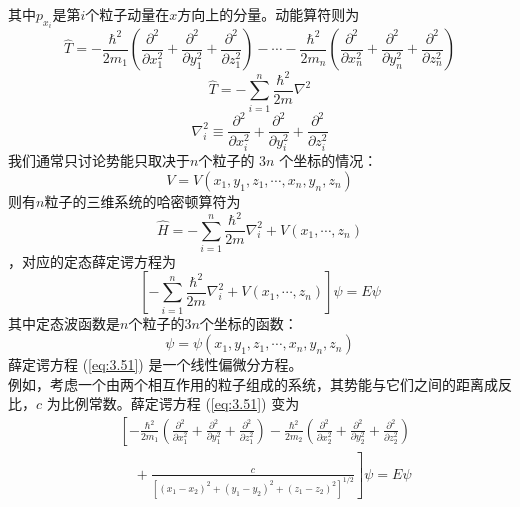 	其中$p_{x_i}$是第$i$个粒子动量在$x$方向上的分量。动能算符则为
	\begin{equation*}
		\hat{T} = -\frac{\hbar^2}{2m_1}\left(\frac{\partial^2}{\partial x_1^2}+\frac{\partial^2}{\partial y_1^2}+\frac{\partial^2}{\partial z_1^2}\right) - \cdots - \frac{\hbar^2}{2m_n}\left(\frac{\partial^2}{\partial x_n^2}+\frac{\partial^2}{\partial y_n^2}+\frac{\partial^2}{\partial z_n^2}\right)
	\end{equation*}
	\begin{equation}
		\boxed{
			\hat{T} = - \sum_{i=1}^{n}\frac{\hbar^2}{2m}\nabla^2
		}
		\label{eq:3.48}
	\end{equation}
	\begin{equation}
		\boxed{
			\nabla_i^2 \equiv \frac{\partial^2}{\partial x_i^2} + \frac{\partial^2}{\partial y_i^2} + \frac{\partial^2}{\partial z_i^2}
		}
		\label{eq:3.49}
	\end{equation}
	我们通常只讨论势能只取决于$n$个粒子的 $3n$ 个坐标的情况：
	\begin{equation*}
		V = V\left(x_1,y_1,z_1,\cdots, x_n,y_n,z_n\right)
	\end{equation*}
	则有$n$粒子的三维系统的哈密顿算符为
	\begin{equation}
		\boxed{
			\hat{H} = -\sum_{i=1}^{n}\frac{\hbar^2}{2m}\nabla_i^2+V\left(x_1,\cdots,z_n\right)
		}
		\label{eq:3.50}
	\end{equation}
	，对应的定态薛定谔方程为
	\begin{equation}
		\left[-\sum_{i=1}^{n}\frac{\hbar^2}{2m}\nabla_i^2+V\left(x_1,\cdots,z_n\right)\right]\psi = E\psi
		\label{eq:3.51}
	\end{equation}
	其中定态波函数是$n$个粒子的$3n$个坐标的函数：
	\begin{equation}
		\psi = \psi\left(x_1,y_1,z_1,\cdots,x_n,y_n,z_n\right)
		\label{eq:3.52}
	\end{equation}
	薛定谔方程 (\ref{eq:3.51}) 是一个线性偏微分方程。\\
	\indent 例如，考虑一个由两个相互作用的粒子组成的系统，其势能与它们之间的距离成反比，$c$ 为比例常数。薛定谔方程 (\ref{eq:3.51}) 变为
	\begin{equation}
		\begin{aligned}
			&\left[-\frac{\hbar^2}{2m_1}\left(\frac{\partial^2}{\partial x_1^2} + \frac{\partial^2}{\partial y_1^2} + \frac{\partial^2}{\partial z_1^2}\right) - \frac{\hbar^2}{2m_2}\left(\frac{\partial^2}{\partial x_2^2} + \frac{\partial^2}{\partial y_2^2} + \frac{\partial^2}{\partial z_2^2}\right) \right.\\
			&\quad + \left. \frac{c}{\left[\left(x_1-x_2\right)^2+\left(y_1-y_2\right)^2+\left(z_1-z_2\right)^2\right]^{1/2}}\right]\psi = E\psi
		\end{aligned}
		\label{eq:3.53}
	\end{equation}
